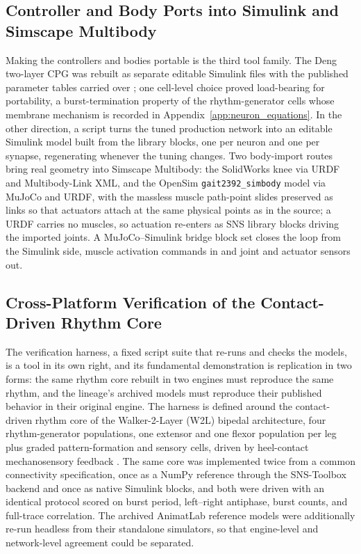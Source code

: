 \subsection{Controller and Body Ports into Simulink and Simscape Multibody}\label{sec:sns_ports}

Making the controllers and bodies portable is the third tool family. The Deng two-layer CPG was rebuilt as separate editable Simulink files with the published parameter tables carried over \citep{deng_neuromechanical_2019, nourse_sns_2023}; one cell-level choice proved load-bearing for portability, a burst-termination property of the rhythm-generator cells whose membrane mechanism is recorded in Appendix~\ref{app:neuron_equations}. In the other direction, a script turns the tuned production network into an editable Simulink model built from the library blocks, one per neuron and one per synapse, regenerating whenever the tuning changes. Two body-import routes bring real geometry into Simscape Multibody: the SolidWorks knee via URDF and Multibody-Link XML, and the OpenSim \texttt{gait2392\_simbody} model via MuJoCo and URDF, with the massless muscle path-point slides preserved as links so that actuators attach at the same physical points as in the source; a URDF carries no muscles, so actuation re-enters as SNS library blocks driving the imported joints. A MuJoCo--Simulink bridge block set closes the loop from the Simulink side, muscle activation commands in and joint and actuator sensors out.

\subsection{Cross-Platform Verification of the Contact-Driven Rhythm Core}\label{sec:crossengine_methods}

The verification harness, a fixed script suite that re-runs and checks the models, is a tool in its own right, and its fundamental demonstration is replication in two forms: the same rhythm core rebuilt in two engines must reproduce the same rhythm, and the lineage's archived models must reproduce their published behavior in their original engine. The harness is defined around the contact-driven rhythm core of the Walker-2-Layer (W2L) bipedal architecture, four rhythm-generator populations, one extensor and one flexor population per leg plus graded pattern-formation and sensory cells, driven by heel-contact mechanosensory feedback \citep{deng_neuromechanical_2019}. The same core was implemented twice from a common connectivity specification, once as a NumPy reference through the SNS-Toolbox backend and once as native Simulink blocks, and both were driven with an identical protocol scored on burst period, left--right antiphase, burst counts, and full-trace correlation. The archived AnimatLab reference models were additionally re-run headless from their standalone simulators, so that engine-level and network-level agreement could be separated.


